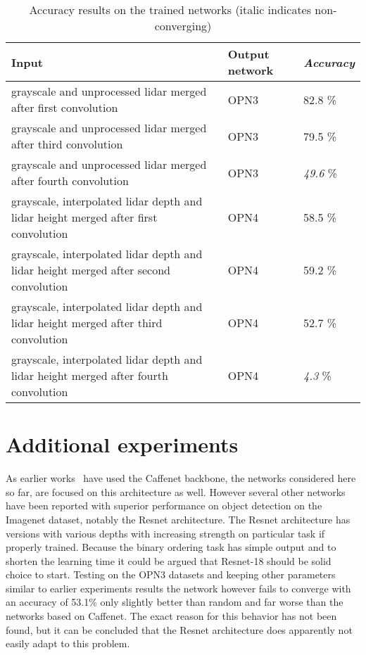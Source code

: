 \begin{table}[]
\centering
\caption{Accuracy results on the trained networks (italic indicates non-converging)}
\label{tab:merge_results}
\begin{tabular}{|p{7.5cm}|p{2cm}|p{2cm}|}
\hline
\textbf{Input}                                                          & \textbf{Output network} & \textit{\textbf{Accuracy}} \\ \hline
grayscale and unprocessed lidar merged after first convolution          & OPN3                    & 82.8 \%                   \\ \hline
grayscale and unprocessed lidar merged after third convolution          & OPN3                    & 79.5 \%                   \\ \hline
grayscale and unprocessed lidar merged after fourth convolution         & OPN3                    & \textit{49.6} \%          \\ \hline
grayscale, interpolated lidar depth and lidar height merged after first convolution          & OPN4                    & 58.5 \%                   \\ \hline
grayscale, interpolated lidar depth and lidar height merged after second convolution         & OPN4                    & 59.2 \%                   \\ \hline
grayscale, interpolated lidar depth and lidar height merged after third convolution          & OPN4                    & 52.7 \%                   \\ \hline
grayscale, interpolated lidar depth and lidar height merged after fourth convolution         & OPN4                    & \textit{4.3} \%                   \\ \hline
\end{tabular}
\end{table}

\section{Additional experiments}
As earlier works~\cite{misra2016,lee2017} have used the Caffenet backbone, the networks considered here so far, are focused on this architecture as well. However several other networks have been reported with superior performance on object detection on the Imagenet dataset, notably the Resnet architecture\cite{he2016}. The Resnet architecture has versions with various depths with increasing strength on particular task if properly trained. Because the binary ordering task has simple output and to shorten the learning time it could be argued that Resnet-18 should be solid choice to start. Testing on the OPN3 datasets and keeping other parameters similar to earlier experiments results the network however fails to converge with an accuracy of 53.1\% only slightly better than random and far worse than the networks based on Caffenet. The exact reason for this behavior has not been found, but it can be concluded that the Resnet architecture does apparently not easily adapt to this problem.

